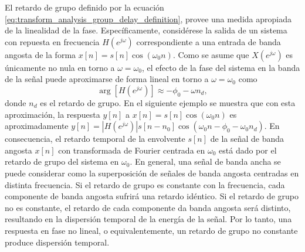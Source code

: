 \documentclass[a4paper]{report}
\begin{document}
El retardo de grupo definido por la ecuación \ref{eq:transform_analysis_group_delay_definition}, provee una medida apropiada de la linealidad de la fase. Específicamente, considérese la salida de un sistema con repuesta en frecuencia \(H(e^{j\omega})\) correspondiente a una entrada de banda angosta de la forma \(x[n]=s[n]\cos(\omega_0n)\). Como se asume que \(X(e^{j\omega})\) es únicamente no nula en torno a \(\omega=\omega_0\), el efecto de la fase del sistema en la banda de la señal puede aproximarse de forma lineal en torno a \(\omega=\omega_0\) como
\[
 \arg[H(e^{j\omega})]\approx-\phi_0-\omega n_d,
\]
donde \(n_d\) es el retardo de grupo. En el siguiente ejemplo se muestra que con esta aproximación, la respuesta \(y[n]\) a \(x[n]=s[n]\cos(\omega_0n)\) es aproximadamente \(y[n]=|H(e^{j\omega})|s[n-n_0]\cos(\omega_0n-\phi_0-\omega_0n_d)\). En consecuencia, el retardo temporal de la envolvente \(s[n]\) de la señal de banda angosta \(x[n]\) con transformada de Fourier centrada en \(\omega_0\) está dado por el retardo de grupo del sistema en \(\omega_0\). En general, una señal de banda ancha se puede considerar como la superposición de señales de banda angosta centradas en distinta frecuencia. Si el retardo de grupo es constante con la frecuencia, cada componente de banda angosta sufrirá una retardo idéntico. Si el retardo de grupo no es constante, el retardo de cada componente da banda angosta será distinto, resultando en la dispersión temporal de la energía de la señal. Por lo tanto, una respuesta en fase no lineal, o equivalentemente, un retardo de grupo no constante produce dispersión temporal.
\end{document}
